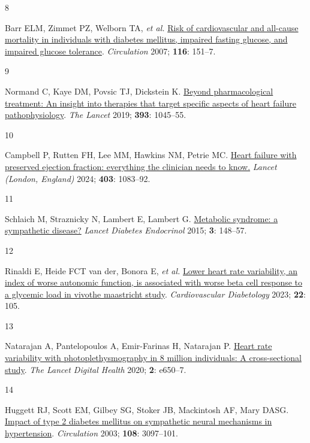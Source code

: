 \documentclass[
  a4paper,
  headsepline=true,
  open=any]{scrbook}
\newlength{\cslhangindent}
\newlength{\csllabelwidth}
\newlength{\cslentryspacingunit} %
\newenvironment{CSLReferences}[2] %
 {%
  \setlength{\parindent}{0pt}
  \ifodd #1
  \let\oldpar\par
  \def\par{\hangindent=\cslhangindent\oldpar}
  \fi
  \setlength{\parskip}{#2\cslentryspacingunit}
 }%
 {}
\newcommand{\CSLLeftMargin}[1]{\parbox[t]{\csllabelwidth}{#1}}
\newcommand{\CSLRightInline}[1]{\parbox[t]{\linewidth - \csllabelwidth}{#1}\break}
\begin{document}
\begin{CSLReferences}{0}{0}
\leavevmode{}%
\CSLLeftMargin{8 }%
\CSLRightInline{Barr ELM, Zimmet PZ, Welborn TA, \emph{et al.}
\href{https://doi.org/10.1161/CIRCULATIONAHA.106.685628}{Risk of
cardiovascular and all-cause mortality in individuals with diabetes
mellitus, impaired fasting glucose, and impaired glucose tolerance}.
\emph{Circulation} 2007; \textbf{116}: 151--7.}

\leavevmode{}%
\CSLLeftMargin{9 }%
\CSLRightInline{Normand C, Kaye DM, Povsic TJ, Dickstein K.
\href{https://doi.org/10.1016/S0140-6736(18)32216-5}{Beyond
pharmacological treatment: An insight into therapies that target
specific aspects of heart failure pathophysiology}. \emph{The Lancet}
2019; \textbf{393}: 1045--55.}

\leavevmode{}%
\CSLLeftMargin{10 }%
\CSLRightInline{Campbell P, Rutten FH, Lee MM, Hawkins NM, Petrie MC.
\href{https://doi.org/10.1016/S0140-6736(23)02756-3}{Heart failure with
preserved ejection fraction: everything the clinician needs to know.}
\emph{Lancet (London, England)} 2024; \textbf{403}: 1083--92.}

\leavevmode{}%
\CSLLeftMargin{11 }%
\CSLRightInline{Schlaich M, Straznicky N, Lambert E, Lambert G.
\href{https://doi.org/10.1016/s2213-8587(14)70033-6}{Metabolic syndrome:
a sympathetic disease?} \emph{Lancet Diabetes Endocrinol} 2015;
\textbf{3}: 148--57.}

\leavevmode{}%
\CSLLeftMargin{12 }%
\CSLRightInline{Rinaldi E, Heide FCT van der, Bonora E, \emph{et al.}
\href{https://doi.org/10.1186/s12933-023-01837-0}{Lower heart rate
variability, an index of worse autonomic function, is associated with
worse beta cell response to a glycemic load in vivo{\textemdash}the
maastricht study}. \emph{Cardiovascular Diabetology} 2023; \textbf{22}:
105.}

\leavevmode{}%
\CSLLeftMargin{13 }%
\CSLRightInline{Natarajan A, Pantelopoulos A, Emir-Farinas H, Natarajan
P. \href{https://doi.org/10.1016/S2589-7500(20)30246-6}{Heart rate
variability with photoplethysmography in 8 million individuals: A
cross-sectional study}. \emph{The Lancet Digital Health} 2020;
\textbf{2}: e650--7.}

\leavevmode{}%
\CSLLeftMargin{14 }%
\CSLRightInline{Huggett RJ, Scott EM, Gilbey SG, Stoker JB, Mackintosh
AF, Mary DASG.
\href{https://doi.org/10.1161/01.CIR.0000103123.66264.FE}{Impact of type
2 diabetes mellitus on sympathetic neural mechanisms in hypertension}.
\emph{Circulation} 2003; \textbf{108}: 3097--101.}


\end{CSLReferences}
\end{document}

